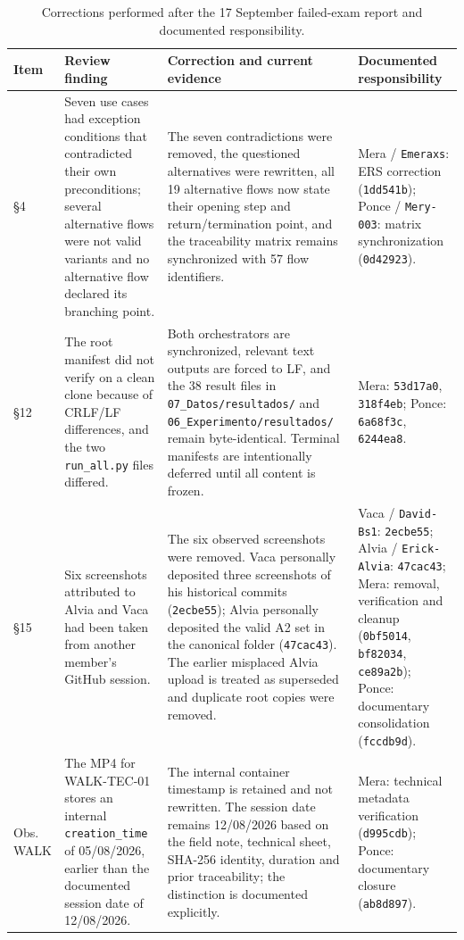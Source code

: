 \documentclass[pdflatex,sn-basic]{sn-jnl}
\begin{document}
\begin{table}[H]
\caption{Corrections performed after the 17 September failed-exam report and documented responsibility.}\label{tab:retrospective}
\centering\scriptsize
\begin{tabularx}{\textwidth}{@{}p{1.0cm}X X p{3.3cm}@{}}
\toprule
Item & Review finding & Correction and current evidence & Documented responsibility \\
\midrule
\S4 & Seven use cases had exception conditions that contradicted their own preconditions; several alternative flows were not valid variants and no alternative flow declared its branching point. & The seven contradictions were removed, the questioned alternatives were rewritten, all 19 alternative flows now state their opening step and return/termination point, and the traceability matrix remains synchronized with 57 flow identifiers. & Mera / \texttt{Emeraxs}: ERS correction (\texttt{1dd541b}); Ponce / \texttt{Mery-003}: matrix synchronization (\texttt{0d42923}). \\
\S12 & The root manifest did not verify on a clean clone because of CRLF/LF differences, and the two \texttt{run\_all.py} files differed. & Both orchestrators are synchronized, relevant text outputs are forced to LF, and the 38 result files in \texttt{07\_Datos/resultados/} and \texttt{06\_Experimento/resultados/} remain byte-identical. Terminal manifests are intentionally deferred until all content is frozen. & Mera: \texttt{53d17a0}, \texttt{318f4eb}; Ponce: \texttt{6a68f3c}, \texttt{6244ea8}. \\
\S15 & Six screenshots attributed to Alvia and Vaca had been taken from another member's GitHub session. & The six observed screenshots were removed. Vaca personally deposited three screenshots of his historical commits (\texttt{2ecbe55}); Alvia personally deposited the valid A2 set in the canonical folder (\texttt{47cac43}). The earlier misplaced Alvia upload is treated as superseded and duplicate root copies were removed. & Vaca / \texttt{David-Bs1}: \texttt{2ecbe55}; Alvia / \texttt{Erick-Alvia}: \texttt{47cac43}; Mera: removal, verification and cleanup (\texttt{0bf5014}, \texttt{bf82034}, \texttt{ce89a2b}); Ponce: documentary consolidation (\texttt{fccdb9d}). \\
Obs. WALK & The MP4 for WALK-TEC-01 stores an internal \texttt{creation\_time} of 05/08/2026, earlier than the documented session date of 12/08/2026. & The internal container timestamp is retained and not rewritten. The session date remains 12/08/2026 based on the field note, technical sheet, SHA-256 identity, duration and prior traceability; the distinction is documented explicitly. & Mera: technical metadata verification (\texttt{d995cdb}); Ponce: documentary closure (\texttt{ab8d897}). \\

\end{tabularx}
\end{table}
\end{document}
